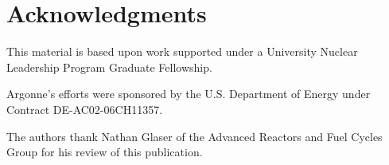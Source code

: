 \section{Acknowledgments}
This material is based upon work supported under a University Nuclear 
Leadership Program Graduate
Fellowship. 

Argonne's efforts were sponsored by the U.S. Department of 
Energy under Contract DE-AC02-06CH11357.

The authors thank Nathan Glaser of the Advanced Reactors and 
Fuel Cycles Group for his review of this publication. 